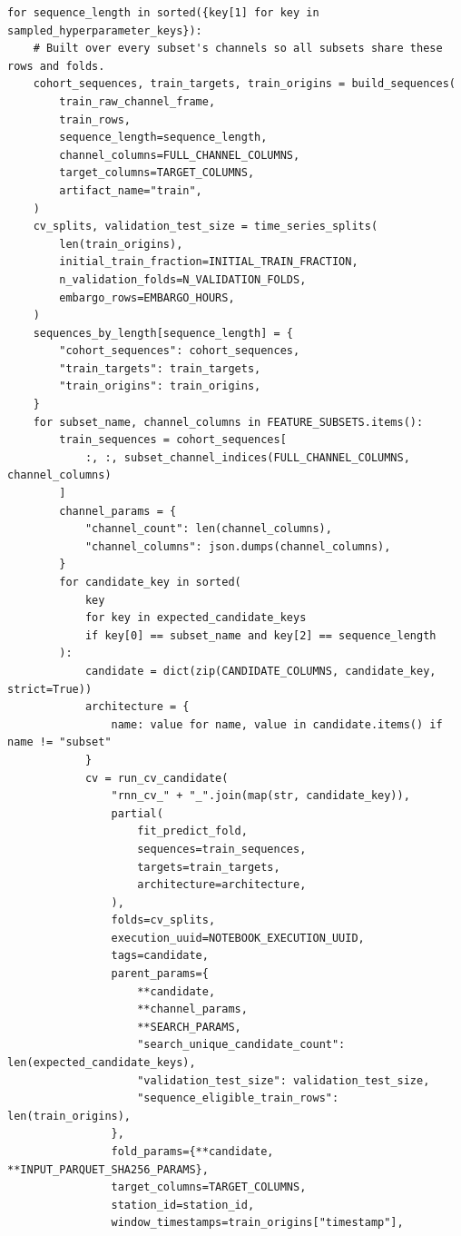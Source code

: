 \begin{verbatim}
for sequence_length in sorted({key[1] for key in sampled_hyperparameter_keys}):
    # Built over every subset's channels so all subsets share these rows and folds.
    cohort_sequences, train_targets, train_origins = build_sequences(
        train_raw_channel_frame,
        train_rows,
        sequence_length=sequence_length,
        channel_columns=FULL_CHANNEL_COLUMNS,
        target_columns=TARGET_COLUMNS,
        artifact_name="train",
    )
    cv_splits, validation_test_size = time_series_splits(
        len(train_origins),
        initial_train_fraction=INITIAL_TRAIN_FRACTION,
        n_validation_folds=N_VALIDATION_FOLDS,
        embargo_rows=EMBARGO_HOURS,
    )
    sequences_by_length[sequence_length] = {
        "cohort_sequences": cohort_sequences,
        "train_targets": train_targets,
        "train_origins": train_origins,
    }
    for subset_name, channel_columns in FEATURE_SUBSETS.items():
        train_sequences = cohort_sequences[
            :, :, subset_channel_indices(FULL_CHANNEL_COLUMNS, channel_columns)
        ]
        channel_params = {
            "channel_count": len(channel_columns),
            "channel_columns": json.dumps(channel_columns),
        }
        for candidate_key in sorted(
            key
            for key in expected_candidate_keys
            if key[0] == subset_name and key[2] == sequence_length
        ):
            candidate = dict(zip(CANDIDATE_COLUMNS, candidate_key, strict=True))
            architecture = {
                name: value for name, value in candidate.items() if name != "subset"
            }
            cv = run_cv_candidate(
                "rnn_cv_" + "_".join(map(str, candidate_key)),
                partial(
                    fit_predict_fold,
                    sequences=train_sequences,
                    targets=train_targets,
                    architecture=architecture,
                ),
                folds=cv_splits,
                execution_uuid=NOTEBOOK_EXECUTION_UUID,
                tags=candidate,
                parent_params={
                    **candidate,
                    **channel_params,
                    **SEARCH_PARAMS,
                    "search_unique_candidate_count": len(expected_candidate_keys),
                    "validation_test_size": validation_test_size,
                    "sequence_eligible_train_rows": len(train_origins),
                },
                fold_params={**candidate, **INPUT_PARQUET_SHA256_PARAMS},
                target_columns=TARGET_COLUMNS,
                station_id=station_id,
                window_timestamps=train_origins["timestamp"],

\end{verbatim}
